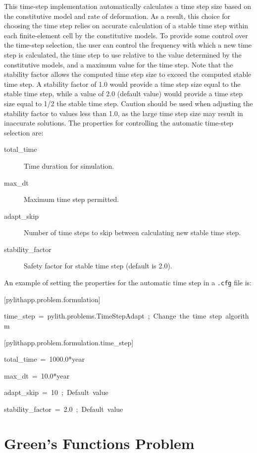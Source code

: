 This time-step implementation automatically calculates a time step
size based on the constitutive model and rate of deformation. As a
result, this choice for choosing the time step relies on accurate
calculation of a stable time step within each finite-element cell
by the constitutive models. To provide some control over the time-step
selection, the user can control the frequency with which a new time
step is calculated, the time step to use relative to the value determined
by the constitutive models, and a maximum value for the time step.
Note that the stability factor allows the computed time step size
to exceed the computed stable time step. A stability factor of 1.0
would provide a time step size equal to the stable time step, while
a value of 2.0 (default value) would provide a time step size equal
to 1/2 the stable time step. Caution should be used when adjusting
the stability factor to values less than 1.0, as the large time step
size may result in inaccurate solutions. The properties for controlling
the automatic time-step selection are:
\begin{description}
\item [{total\_time}] Time duration for simulation.
\item [{max\_dt}] Maximum time step permitted.
\item [{adapt\_skip}] Number of time steps to skip between calculating
new stable time step.
\item [{stability\_factor}] Safety factor for stable time step (default
is 2.0).
\end{description}
An example of setting the properties for the automatic time step in
a \texttt{.cfg} file is:
\begin{lyxcode}
{[}pylithapp.problem.formulation{]}

time\_step~=~pylith.problems.TimeStepAdapt~;~Change~the~time~step~algorithm



{[}pylithapp.problem.formulation.time\_step{]}

total\_time~=~1000.0{*}year

max\_dt~=~10.0{*}year

adapt\_skip~=~10~;~Default~value

stability\_factor~=~2.0~;~Default~value
\end{lyxcode}

\section{Green's Functions Problem}

